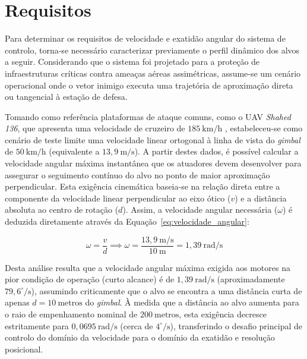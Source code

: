 \section{Requisitos}
\label{sec:requisitos}

Para determinar os requisitos de velocidade e exatidão angular do sistema de controlo, torna-se necessário caracterizar previamente o perfil dinâmico dos alvos a seguir. Considerando que o sistema foi projetado para a proteção de infraestruturas críticas contra ameaças aéreas assimétricas, assume-se um cenário operacional onde o vetor inimigo executa uma trajetória de aproximação direta ou tangencial à estação de defesa. 

Tomando como referência plataformas de ataque comuns, como o \ac{UAV} \emph{Shahed 136}, que apresenta uma velocidade de cruzeiro de $185~\text{km/h}$ \parencite{buncombe2024russia}, estabeleceu-se como cenário de teste limite uma velocidade linear ortogonal à linha de vista do \emph{gimbal} de $50~\text{km/h}$ (equivalente a $13{,}9~\text{m/s}$). A partir destes dados, é possível calcular a velocidade angular máxima instantânea que os atuadores devem desenvolver para assegurar o seguimento contínuo do alvo no ponto de maior aproximação perpendicular. Esta exigência cinemática baseia-se na relação direta entre a componente da velocidade linear perpendicular ao eixo ótico ($v$) e a distância absoluta ao centro de rotação ($d$). Assim, a velocidade angular necessária ($\omega$) é deduzida diretamente através da Equação~\ref{eq:velocidade_angular}:

\begin{equation}
    \omega = \frac{v}{d} \implies \omega = \frac{13{,}9~\text{m/s}}{10~\text{m}} = 1{,}39~\text{rad/s}
    \label{eq:velocidade_angular}
\end{equation}

Desta análise resulta que a velocidade angular máxima exigida aos motores na pior condição de operação (curto alcance) é de $1{,}39~\text{rad/s}$ (aproximadamente $79{,}6^\circ/\text{s}$), assumindo criticamente que o alvo se encontra a uma distância curta de apenas $d = 10~\text{metros}$ do \emph{gimbal}. À medida que a distância ao alvo aumenta para o raio de empenhamento nominal de $200~\text{metros}$, esta exigência decresce estritamente para $0{,}0695~\text{rad/s}$ (cerca de $4^\circ/\text{s}$), transferindo o desafio principal de controlo do domínio da velocidade para o domínio da exatidão e resolução posicional.

